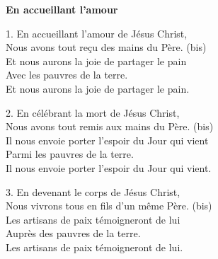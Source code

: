\textbf{En accueillant l'amour}

1.  En accueillant l’amour de Jésus Christ, \\
Nous avons tout reçu des mains du Père. (bis) \\
Et nous aurons la joie de partager le pain \\
Avec les pauvres de la terre. \\
Et nous aurons la joie de partager le pain.

2.  En célébrant la mort de Jésus Christ, \\
Nous avons tout remis aux mains du Père. (bis) \\
Il nous envoie porter l’espoir du Jour qui vient \\
Parmi les pauvres de la terre. \\
Il nous envoie porter l’espoir du Jour qui vient.

3.  En devenant le corps de Jésus Christ,\\
Nous vivrons tous en fils d’un même Père. (bis)\\
Les artisans de paix témoigneront de lui\\
Auprès des pauvres de la terre.\\
Les artisans de paix témoigneront de lui.
